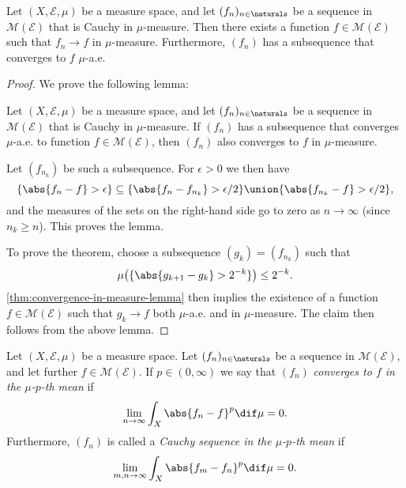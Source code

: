 \documentclass[article, a4paper, 11pt, oneside]{memoir}
\numberwithin{equation}{chapter}
\newcommand{\calE}{\mathcal{E}}
\newcommand{\measurable}{\mathcal{M}}
\newenvironment{displaytheorem}{%
	\begin{displayquote}\itshape%
}{%
	\end{displayquote}%
}
\begin{document}
\begin{theorem}
    Let $(X,\calE,\mu)$ be a measure space, and let $(f_n)_{n\in\naturals}$ be a sequence in $\measurable(\calE)$ that is Cauchy in $\mu$-measure. Then there exists a function $f \in \measurable(\calE)$ such that $f_n \to f$ in $\mu$-measure. Furthermore, $(f_n)$ has a subsequence that converges to $f$ $\mu$-a.e.
\end{theorem}

\begin{proof}
    We prove the following lemma:
    \begin{displaytheorem}
        Let $(X,\calE,\mu)$ be a measure space, and let $(f_n)_{n\in\naturals}$ be a sequence in $\measurable(\calE)$ that is Cauchy in $\mu$-measure. If $(f_n)$ has a subsequence that converges $\mu$-a.e. to function $f \in \measurable(\calE)$, then $(f_n)$ also converges to $f$ in $\mu$-measure.
    \end{displaytheorem}
    Let $(f_{n_k})$ be such a subsequence. For $\epsilon > 0$ we then have
    \begin{equation*}
        \{ \abs{f_n - f} > \epsilon \}
            \subseteq \{ \abs{f_n - f_{n_k}} > \epsilon/2 \} \union \{ \abs{f_{n_k} - f} > \epsilon/2 \},
    \end{equation*}
    and the measures of the sets on the right-hand side go to zero as $n \to \infty$ (since $n_k \geq n$). This proves the lemma.

    To prove the theorem, choose a subsequence $(g_k) = (f_{n_k})$ such that
    \begin{equation*}
        \mu \bigl( \{ \abs{g_{k+1} - g_k} > 2^{-k} \} \bigr)
            \leq 2^{-k}.
    \end{equation*}
    \cref{thm:convergence-in-measure-lemma} then implies the existence of a function $f \in \measurable(\calE)$ such that $g_k \to f$ both $\mu$-a.e. and in $\mu$-measure. The claim then follows from the above lemma.
\end{proof}


\begin{definition}
    Let $(X,\calE,\mu)$ be a measure space. Let $(f_n)_{n\in\naturals}$ be a sequence in $\measurable(\calE)$, and let further $f \in \measurable(\calE)$. If $p \in (0,\infty)$ we say that $(f_n)$ \emph{converges to $f$ in the $\mu$-$p$-th mean} if
    \begin{equation*}
        \lim_{n\to\infty} \int_X \abs{f_n - f}^p \dif\mu = 0.
    \end{equation*}
    Furthermore, $(f_n)$ is called a \emph{Cauchy sequence in the $\mu$-$p$-th mean} if
    \begin{equation*}
        \lim_{m,n\to\infty} \int_X \abs{f_m - f_n}^p \dif\mu = 0.
    \end{equation*}
\end{definition}
\end{document}
